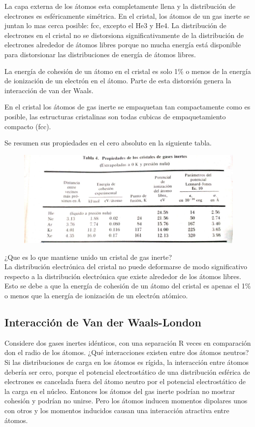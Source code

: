 \documentclass{article}
\begin{document}
La capa externa de los átomos esta completamente llena y la distribución de electrones es esféricamente simétrica. En el cristal, los átomos de un gas inerte se juntan lo mas cerca posible: fcc, excepto el He3 y He4. La distribución de electrones en el cristal no se distorsiona significativamente de la distribución de electrones  alrededor de átomos libres porque no mucha energía está disponible para distorsionar las distribuciones de energía de átomos libres.

La energía de cohesión de un átomo en el cristal es solo 1\% o menos de la energía de ionización de un electrón en el átomo. Parte de esta distorsión genera la interacción de van der Waals.

En el cristal los átomos de gas inerte se empaquetan tan compactamente como es posible, las estructuras cristalinas son todas cubicas de empaquetamiento compacto (fcc).

Se resumen sus propiedades en el cero absoluto en la siguiente tabla.

\begin{figure}[h]
\centering
\includegraphics[width=1\textwidth]{a1.jpeg}
\caption{}
\end{figure}

¿Que es lo que mantiene unido un cristal de gas inerte?\\
La distribución electrónica del cristal no puede deformarse de modo significativo respecto a la distribución electrónica que existe alrededor de los átomos libres. Esto se debe a que la energía de cohesión de un átomo del cristal es apenas el 1\% o menos que la energía de ionización de un electrón atómico.

\subsection{Interacción de Van der Waals-London}
Considere dos gases inertes idénticos, con una separación R veces en comparación don el radio de los átomos. ¿Qué interacciones existen entre dos átomos neutros? Si las distribuciones de carga en los átomos es rígida, la interacción entre átomos debería ser cero, porque el potencial electrostático de una distribución esférica de electrones es cancelada fuera del átomo neutro por el potencial electrostático de la carga en el núcleo. Entonces los átomos del gas inerte  podrían no mostrar cohesión y podrían no unirse. Pero los átomos inducen momentos dipolares unos con otros y los momentos inducidos causan una interacción atractiva entre átomos.
\end{document}
